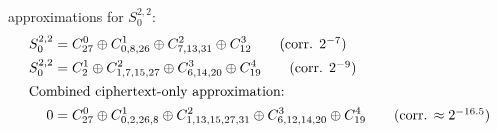 \documentclass[a4paper, 11pt]{article}
\newif\ifsubstates\substatesfalse
\begin{document}
 approximations for $S^{2,2}_{0}$:
\begin{align*}
  S^{2,2}_0 &= C^0_{27} \oplus C^1_{0, 8, 26} \oplus C^2_{7,13,31} \oplus C^3_{12} \tag{corr. $2^{-7}$} \\
  S^{2,2}_0 &= C^1_{2} \oplus C^2_{1,7,15,27} \oplus C^3_{6,14,20} \oplus
  C^4_{19} \tag{corr. $2^{-9}$} \\
\intertext{Combined ciphertext-only approximation:}
  0 &= C^0_{27} \oplus C^1_{0, 2, 26, 8} \oplus C^2_{1,13,15,27,31} \oplus
  C^3_{6,12,14,20} \oplus C^4_{19} \tag{corr. $\approx 2^{-16.5}$}
\end{align*}

\newcommand{\printstate}{
  \ifsubstates \pgfmathsetmacro{\roundsep}{1.25}
  \else        \pgfmathsetmacro{\roundsep}{0.80} \fi
  \pgfmathsetmacro{\opoffset}{.1}

  \ifsubstates
    \foreach \r in {-2,...,4} {
      \foreach \w in {0,...,4} {
        \draw[thick] (\w-.5,-\r*\roundsep) -- ++(0,-.25);
        \node[minimum width=1*1.0cm,minimum height=.25*1.5cm, inner sep=0pt] (W\r\w) at (\w,-\r*\roundsep-.125) {};
      }
      \draw[thick] (-.5,-\r*\roundsep) node[below left, inner sep=0pt, xshift=-3pt] {$S_{\r,*}^{\r}$} rectangle ++(5,-.25);
    }
    \node[minimum width=1*1.0cm,minimum height=.25*1.5cm, inner sep=0pt] (W-1-1) at (-1,--1*\roundsep-.125) {};
    \node[minimum width=1*1.0cm,minimum height=.25*1.5cm, inner sep=0pt] (W-2-1) at (-2,--1*\roundsep-.125) {};
  \else
    \foreach \r in {-1,...,4} {
      \foreach \w in {0,...,4} {
        \coordinate (W\r\w) at (\w,-\r*\roundsep-.125);
      }
    }
    \foreach \w in {0,...,4} {
      \coordinate (W-2\w) at (\w,--2.375*\roundsep-.125);
    }
    \coordinate (W-1-1) at (-1,--1*\roundsep-.125);
    \coordinate (W-2-1) at (-2,--1*\roundsep-.125);
  \fi

}
\end{document}
